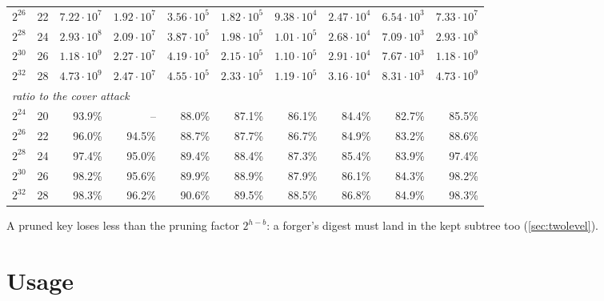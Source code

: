 \documentclass[11pt]{article}
\begin{document}
\begin{center}
\begin{tabular}{llrrrrrrrr}
  $2^{26}$ & 22 & $7.22\cdot10^{7}$ & $1.92\cdot10^{7}$ & $3.56\cdot10^{5}$ & $1.82\cdot10^{5}$ & $9.38\cdot10^{4}$ & $2.47\cdot10^{4}$ & $6.54\cdot10^{3}$ & $7.33\cdot10^{7}$ \\
  $2^{28}$ & 24 & $2.93\cdot10^{8}$ & $2.09\cdot10^{7}$ & $3.87\cdot10^{5}$ & $1.98\cdot10^{5}$ & $1.01\cdot10^{5}$ & $2.68\cdot10^{4}$ & $7.09\cdot10^{3}$ & $2.93\cdot10^{8}$ \\
  $2^{30}$ & 26 & $1.18\cdot10^{9}$ & $2.27\cdot10^{7}$ & $4.19\cdot10^{5}$ & $2.15\cdot10^{5}$ & $1.10\cdot10^{5}$ & $2.91\cdot10^{4}$ & $7.67\cdot10^{3}$ & $1.18\cdot10^{9}$ \\
  $2^{32}$ & 28 & $4.73\cdot10^{9}$ & $2.47\cdot10^{7}$ & $4.55\cdot10^{5}$ & $2.33\cdot10^{5}$ & $1.19\cdot10^{5}$ & $3.16\cdot10^{4}$ & $8.31\cdot10^{3}$ & $4.73\cdot10^{9}$ \\
  \midrule
  \multicolumn{10}{l}{\emph{ratio to the cover attack}} \\
  $2^{24}$ & 20 & 93.9\% & -- & 88.0\% & 87.1\% & 86.1\% & 84.4\% & 82.7\% & 85.5\% \\
  $2^{26}$ & 22 & 96.0\% & 94.5\% & 88.7\% & 87.7\% & 86.7\% & 84.9\% & 83.2\% & 88.6\% \\
  $2^{28}$ & 24 & 97.4\% & 95.0\% & 89.4\% & 88.4\% & 87.3\% & 85.4\% & 83.9\% & 97.4\% \\
  $2^{30}$ & 26 & 98.2\% & 95.6\% & 89.9\% & 88.9\% & 87.9\% & 86.1\% & 84.3\% & 98.2\% \\
  $2^{32}$ & 28 & 98.3\% & 96.2\% & 90.6\% & 89.5\% & 88.5\% & 86.8\% & 84.9\% & 98.3\% \\
  \bottomrule
\end{tabular}
\end{center}
A pruned key loses less than the pruning factor $2^{h-b}$: a forger's digest must land in the kept subtree too
(\cref{sec:twolevel}).

\section{Usage}
\label{sec:usage}
\end{document}
